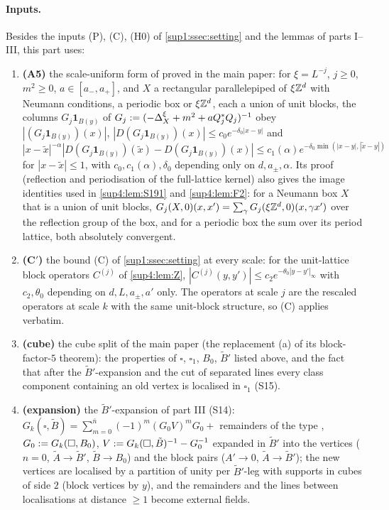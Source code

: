 \paragraph{Inputs.} Besides the inputs (P), (C), (H0) of \cref{sup1:ssec:setting} and the lemmas of parts I--III, this part uses:
\begin{enumerate}[label=\textup{(\roman*)},nosep,leftmargin=*]
\item \textbf{(A5)} the scale-uniform form of \cite[Lemma~2.4]{Ba4} proved in the main paper: for $\xi=L^{-j}$, $j\ge0$, $m^2\ge0$, $a\in[a_-,a_+]$, and $X$ a rectangular parallelepiped of $\xi\mathbb Z^d$ with Neumann conditions, a periodic box or $\xi\mathbb Z^d$, each a union of unit blocks, the columns $G_j\mathbf 1_{B(y)}$ of $G_j:=(-\Delta^\xi_X+m^2+aQ_j^*Q_j)^{-1}$ obey $|(G_j\mathbf 1_{B(y)})(x)|$, $|D(G_j\mathbf 1_{B(y)})(x)|\le c_0e^{-\delta_0|x-y|}$ and $|x-\tilde x|^{-\alpha}|D(G_j\mathbf 1_{B(y)})(\tilde x)-D(G_j\mathbf 1_{B(y)})(x)|\le c_1(\alpha)e^{-\delta_0\min(|x-y|,|\tilde x-y|)}$ for $|x-\tilde x|\le1$, with $c_0,c_1(\alpha),\delta_0$ depending only on $d,a_\pm,\alpha$. Its proof (reflection and periodisation of the full-lattice kernel) also gives the image identities used in \cref{sup4:lem:S191} and \cref{sup4:lem:F2}: for a Neumann box $X$ that is a union of unit blocks, $G_j(X,0)(x,x')=\sum_{\gamma}G_j(\xi\mathbb Z^d,0)(x,\gamma x')$ over the reflection group of the box, and for a periodic box the sum over its period lattice, both absolutely convergent.
\item \textbf{(C$'$)} the bound (C) of \cref{sup1:ssec:setting} at every scale: for the unit-lattice block operators $C^{(j)}$ of \cref{sup4:lem:Z}, $|C^{(j)}(y,y')|\le c_2e^{-\theta_0|y-y'|_\infty}$ with $c_2,\theta_0$ depending on $d,L,a_\pm,a'$ only. The operators at scale $j$ are the rescaled operators at scale $k$ with the same unit-block structure, so (C) applies verbatim.
\item \textbf{(cube)} the cube split of the main paper (the replacement (a) of its block-factor-$5$ theorem): the properties of $\square$, $\square_1$, $B_0$, $\tilde B'$ listed above, and the fact that after the $\tilde B'$-expansion and the cut of separated lines every class component containing an old vertex is localised in $\square_1$ (S15).
\item \textbf{(expansion)} the $\tilde B'$-expansion of part III (S14): $G_k(\square,\tilde B)=\sum_{m=0}^{\bar n}(-1)^m(G_0V)^mG_0+$ remainders of the type \cite[(1.16)]{Ba3}, $G_0:= G_k(\square,B_0)$, $V:= G_k(\square,\tilde B)^{-1}-G_0^{-1}$ expanded in $\tilde B'$ into the vertices \cite[(1.8)--(1.11)]{Ba3} ($n=0$, $\tilde A\to\tilde B'$, $\tilde B\to B_0$) and the block pairs \cite[(1.13)--(1.15)]{Ba3} ($A'\to0$, $\tilde A\to\tilde B'$); the new vertices are localised by a partition of unity per $\tilde B'$-leg with supports in cubes of side $2$ (block vertices by $y$), and the remainders and the lines between localisations at distance $\ge1$ become external fields.
\end{enumerate}
